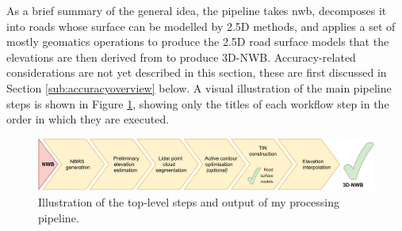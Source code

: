 As a brief summary of the general idea, the pipeline takes \ac{nwb}, decomposes it into roads whose surface can be modelled by 2.5D methods, and applies a set of mostly geomatics operations to produce the 2.5D road surface models that the elevations are then derived from to produce 3D-NWB. Accuracy-related considerations are not yet described in this section, these are first discussed in Section \ref{sub:accuracyoverview} below. A visual illustration of the main pipeline steps is shown in Figure \ref{fig:workflow}, showing only the titles of each workflow step in the order in which they are executed.

\begin{figure}[h]
    \centering
    \includegraphics[width=\linewidth]{final_report/figs/workflow_steps.pdf}
    \caption{Illustration of the top-level steps and output of my processing pipeline.}
    \label{fig:workflow}
\end{figure}

